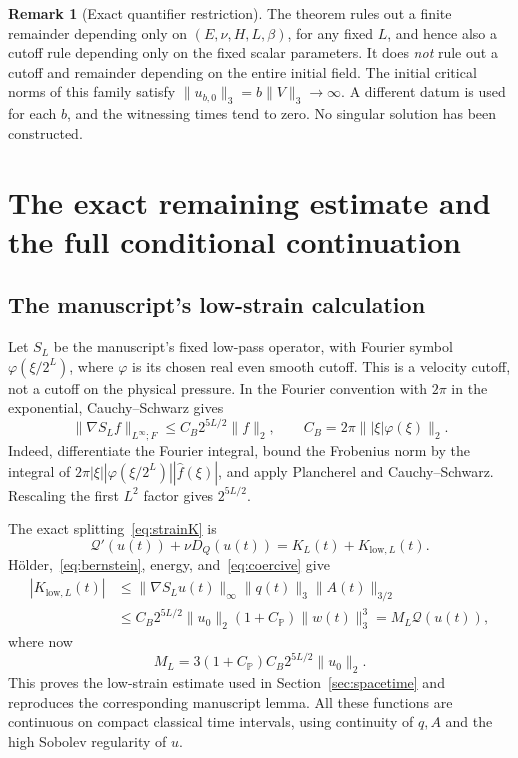 \documentclass[11pt,a4paper]{article}
\theoremstyle{definition}
\newtheorem{remark}[theorem]{Remark}
\newcommand{\Q}{\mathcal Q}
\newcommand{\PP}{\mathbb P}
\begin{document}
\begin{remark}[Exact quantifier restriction]
The theorem rules out a finite remainder depending only on $(E,\nu,H,L,\beta)$, for any fixed $L$, and hence also a cutoff rule depending only on the fixed scalar parameters. It does \emph{not} rule out a cutoff and remainder depending on the entire initial field. The initial critical norms of this family satisfy $\|u_{b,0}\|_3=b\|V\|_3\to\infty$. A different datum is used for each $b$, and the witnessing times tend to zero. No singular solution has been constructed.
\end{remark}

\section{The exact remaining estimate and the full conditional continuation}\label{sec:frontier}

\subsection{The manuscript's low-strain calculation}
Let $S_L$ be the manuscript's fixed low-pass operator, with Fourier symbol $\varphi(\xi/2^L)$, where $\varphi$ is its chosen real even smooth cutoff. This is a velocity cutoff, not a cutoff on the physical pressure. In the Fourier convention with $2\pi$ in the exponential, Cauchy--Schwarz gives
\begin{equation}\label{eq:bernstein}
 \|\nabla S_L f\|_{L^\infty;F}
 \le C_B2^{5L/2}\|f\|_2,
 \qquad C_B=2\pi\bigl\||\xi|\varphi(\xi)\bigr\|_2.
\end{equation}
Indeed, differentiate the Fourier integral, bound the Frobenius norm by the integral of $2\pi|\xi||\varphi(\xi/2^L)||\widehat f(\xi)|$, and apply Plancherel and Cauchy--Schwarz. Rescaling the first $L^2$ factor gives $2^{5L/2}$.

The exact splitting~\eqref{eq:strainK} is
\begin{equation}\label{eq:split-final}
 \Q'(u(t))+\nu D_Q(u(t))=K_L(t)+K_{\mathrm{low},L}(t).
\end{equation}
H\"older,~\eqref{eq:bernstein}, energy, and~\eqref{eq:coercive} give
\begin{align*}
 |K_{\mathrm{low},L}(t)|
 &\le\|\nabla S_Lu(t)\|_\infty\|q(t)\|_3\|A(t)\|_{3/2}\\
 &\le C_B2^{5L/2}\|u_0\|_2(1+C_{\PP})\|w(t)\|_3^3
 =M_L\Q(u(t)),
\end{align*}
where now
\begin{equation}\label{eq:ML}
 M_L=3(1+C_{\PP})C_B2^{5L/2}\|u_0\|_2.
\end{equation}
This proves the low-strain estimate used in Section~\ref{sec:spacetime} and reproduces the corresponding manuscript lemma. All these functions are continuous on compact classical time intervals, using continuity of $q,A$ and the high Sobolev regularity of $u$.
\end{document}
